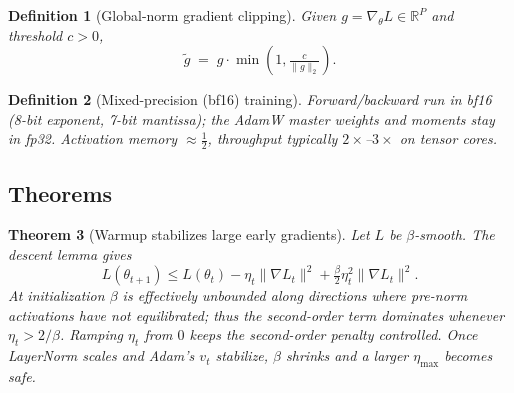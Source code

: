 \documentclass[11pt]{article}
\newtheorem{theorem}{Theorem}[section]
\newtheorem{definition}[theorem]{Definition}
\theoremstyle{remark}
\begin{document}
\begin{definition}[Global-norm gradient clipping]
Given $g=\nabla_\theta L\in\mathbb{R}^P$ and threshold $c>0$,
\[
\widetilde{g} \;=\; g\cdot\min\!\left(1,\tfrac{c}{\|g\|_2}\right).
\]
\end{definition}

\begin{definition}[Mixed-precision (bf16) training]
Forward/backward run in bf16 (8-bit exponent, 7-bit mantissa); the AdamW \emph{master} weights and moments stay in fp32. Activation memory $\approx \tfrac{1}{2}$, throughput typically $2\times$--$3\times$ on tensor cores.
\end{definition}

\subsection*{Theorems}

\begin{theorem}[Warmup stabilizes large early gradients]
Let $L$ be $\beta$-smooth. The descent lemma gives
\[
L(\theta_{t+1}) \le L(\theta_t) - \eta_t\|\nabla L_t\|^2 + \tfrac{\beta}{2}\eta_t^2\|\nabla L_t\|^2.
\]
At initialization $\beta$ is effectively unbounded along directions where pre-norm activations have not equilibrated; thus the second-order term dominates whenever $\eta_t > 2/\beta$. Ramping $\eta_t$ from $0$ keeps the second-order penalty controlled. Once LayerNorm scales and Adam's $v_t$ stabilize, $\beta$ shrinks and a larger $\eta_{\max}$ becomes safe.
\end{theorem}
\end{document}
